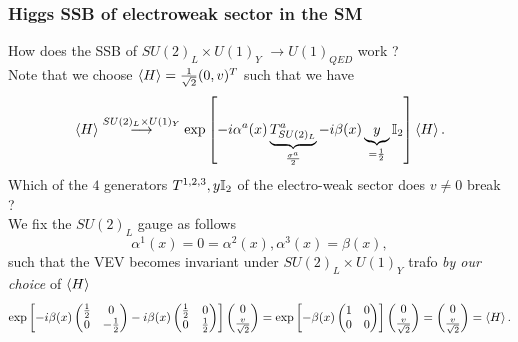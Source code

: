 \subsubsection{Higgs SSB of electroweak sector in the SM}
\label{subsubsec:higgsSMSSB}
How does the SSB of $SU(2)_L \times U(1)_Y$ $\rightarrow U(1)_{QED}$ work ?\\
Note that we choose $\expval{H}= \frac{1}{\sqrt{2}} (0,v)^T$ such that we have
\begin{equation}
\expval{H} \stackrel{SU(2)_L \times U(1)_Y}{\longrightarrow} \exp\left[-i \alpha^a(x) \underbrace{T^a_{SU(2)_L}}_{\frac{\sigma^a}{2}} -i \beta(x) \underbrace{y}_{=\frac{1}{2}} \mathbb{I}_2 \right] \expval{H}.
\end{equation}
Which of the $4$ generators $T^{1,2,3}, y\mathbb{I}_2$ of the electro-weak sector does $v\neq 0$ break ?\\
We fix the $SU(2)_L$ gauge as follows
\begin{equation}
\alpha^1(x) =0=\alpha^2(x), \alpha^3(x) = \beta(x),
\end{equation}
such that the VEV becomes invariant under $SU(2)_L\times U(1)_Y$ trafo \emph{by our choice} of $\expval{H}$
\begin{equation}
\exp\left[-i \beta(x) \begin{pmatrix}
\frac{1}{2} & 0 \\
0 & - \frac{1}{2} \\
\end{pmatrix}
-i \beta(x) 
\begin{pmatrix}
\frac{1}{2} &0 \\
0& \frac{1}{2} \\
\end{pmatrix}
\right]
\begin{pmatrix}
0 \\
\frac{v}{\sqrt{2}}
\end{pmatrix}
= \exp\left[-\beta(x) \begin{pmatrix}
1&0 \\
0&0 \\
\end{pmatrix}\right] \begin{pmatrix}
0 \\
\frac{v}{\sqrt{2}}
\end{pmatrix}
= \begin{pmatrix}
0 \\
\frac{v}{\sqrt{2}}\\
\end{pmatrix} = \expval{H}.
\end{equation}
